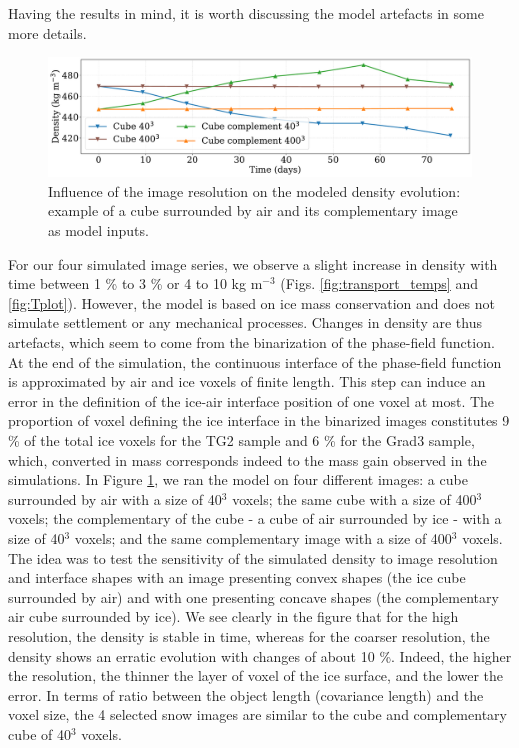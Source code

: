 \documentclass[draft,ms]{agujournal2019}
\begin{document}
Having the results in mind, it is worth discussing the model artefacts in some more details. 
\begin{figure}
    \centering
    \includegraphics[width=0.9\linewidth]{Figures/cubes_compl_density_propre.pdf}
    \caption{Influence of the image resolution on the modeled density evolution: example of a cube surrounded by air and its complementary image as model inputs.}
    \label{fig:cubes}
\end{figure}
For our four simulated image series, we observe a slight increase in density with time between 1 \% to 3 \% or 4 to 10 kg m$^{-3}$ (Figs. \ref{fig:transport_temps} and \ref{fig:Tplot}). However, the model is based on ice mass conservation and does not simulate settlement or any mechanical processes. Changes in density are thus artefacts, which seem to come from the binarization of the phase-field function. At the end of the simulation, the continuous interface of the phase-field function is approximated by air and ice voxels of finite length. This step can induce an error in the definition of the ice-air interface position of one voxel at most. The proportion of voxel defining the ice interface in the binarized images constitutes 9 \% of the total ice voxels for the TG2 sample and 6 \% for the Grad3 sample, which, converted in mass corresponds indeed to the mass gain observed in the simulations. In Figure \ref{fig:cubes}, we ran the model on four different images: a cube surrounded by air with a size of 40$^3$ voxels; the same cube with a size of 400$^3$ voxels; the complementary of the cube - a cube of air surrounded by ice - with a size of 40$^3$ voxels; and the same complementary image with a size of 400$^3$ voxels. The idea was to test the sensitivity of the simulated density to image resolution and interface shapes with an image presenting convex shapes (the ice cube surrounded by air) and with one presenting concave shapes (the complementary air cube surrounded by ice). We see clearly in the figure that for the high resolution, the density is stable in time, whereas for the coarser resolution, the density shows an erratic evolution with changes of about 10 \%. Indeed, the higher the resolution, the thinner the layer of voxel of the ice surface, and the lower the error. In terms of ratio between the object length (covariance length) and the voxel size, the 4 selected snow images are similar to the cube and complementary cube of 40$^3$ voxels. 
\end{document}
